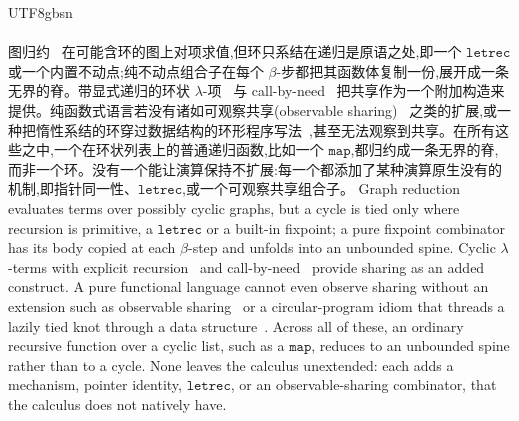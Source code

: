 \begin{CJK*}{UTF8}{gbsn}
  \paragraph{}
  \ifTablambdaChinese
  图归约~\cite{wadsworth1971-semantics-lambda-calculus} 在可能含环的图上对项求值,但环只系结在递归是原语之处,即一个 $\mathtt{letrec}$ 或一个内置不动点;纯不动点组合子在每个 $\beta$-步都把其函数体复制一份,展开成一条无界的脊。带显式递归的环状 $\lambda$-项~\cite{ariola1997-explicit-recursion} 与 call-by-need~\cite{ariola1997-call-by-need} 把共享作为一个附加构造来提供。纯函数式语言若没有诸如可观察共享(observable sharing)~\cite{gill2009-observable-sharing} 之类的扩展,或一种把惰性系结的环穿过数据结构的环形程序写法~\cite{bird1984-circular-programs},甚至无法观察到共享。在所有这些之中,一个在环状列表上的普通递归函数,比如一个 $\mathtt{map}$,都归约成一条无界的脊,而非一个环。没有一个能让演算保持不扩展:每一个都添加了某种演算原生没有的机制,即指针同一性、$\mathtt{letrec}$,或一个可观察共享组合子。
  \else
  Graph reduction~\cite{wadsworth1971-semantics-lambda-calculus} evaluates terms over possibly cyclic graphs, but a cycle is tied only where recursion is primitive, a $\mathtt{letrec}$ or a built-in fixpoint; a pure fixpoint combinator has its body copied at each $\beta$-step and unfolds into an unbounded spine. Cyclic $\lambda$-terms with explicit recursion~\cite{ariola1997-explicit-recursion} and call-by-need~\cite{ariola1997-call-by-need} provide sharing as an added construct. A pure functional language cannot even observe sharing without an extension such as observable sharing~\cite{gill2009-observable-sharing} or a circular-program idiom that threads a lazily tied knot through a data structure~\cite{bird1984-circular-programs}. Across all of these, an ordinary recursive function over a cyclic list, such as a $\mathtt{map}$, reduces to an unbounded spine rather than to a cycle. None leaves the calculus unextended: each adds a mechanism, pointer identity, $\mathtt{letrec}$, or an observable-sharing combinator, that the calculus does not natively have.
  \fi



\end{CJK*}
